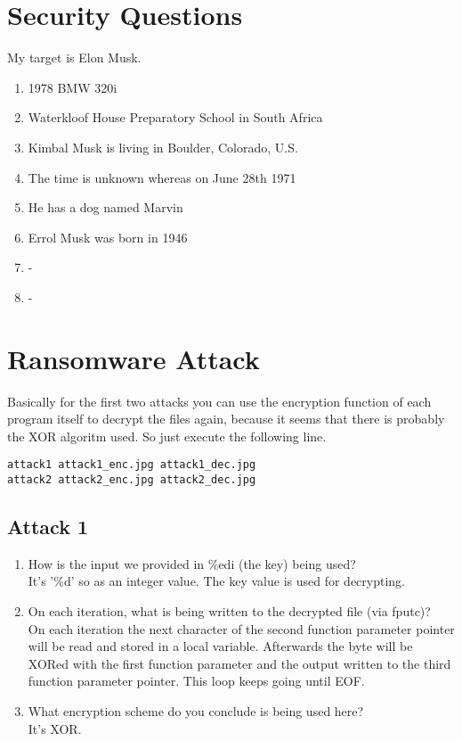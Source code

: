 

\section{Security Questions}
My target is Elon Musk.
\begin{enumerate}

\item 1978 BMW 320i 

\item Waterkloof House Preparatory School in South Africa

\item Kimbal Musk is living in Boulder, Colorado, U.S. 

\item The time is unknown whereas on June 28th 1971

\item He has a dog named Marvin

\item Errol Musk was born in 1946

\item -

\item -

\end{enumerate}


\section{Ransomware Attack}
Basically for the first two attacks you can use the encryption function of each program itself to decrypt the files again, because it seems that there is probably the XOR algoritm used. So just execute the following line.
\begin{lstlisting}
attack1 attack1_enc.jpg attack1_dec.jpg
attack2 attack2_enc.jpg attack2_dec.jpg
\end{lstlisting}

\subsection{Attack 1}
\begin{enumerate}
\item How is the input we provided in \%edi (the key) being used?\\
It's '\%d' so as an integer value. The key value is used for decrypting. 
\item On each iteration, what is being written to the decrypted file (via fputc)?\\
On each iteration the next character of the second function parameter pointer will be read and stored in a local variable. Afterwards the byte will be XORed with the first function parameter and the output written to the third function parameter pointer. This loop keeps going until EOF.
\item What encryption scheme do you conclude is being used here?\\
It's XOR.
\end{enumerate}

